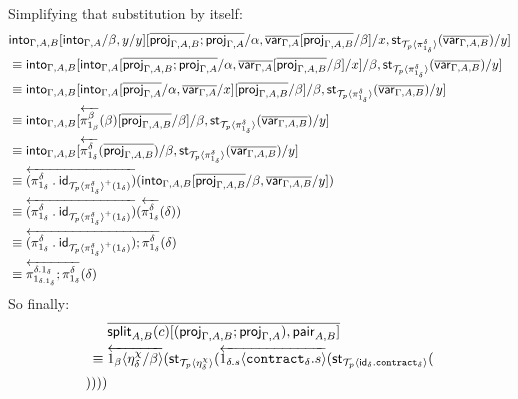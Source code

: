 \documentclass[10pt]{article}
\theoremstyle{definition}
\newcommand{\id}{\mathsf{id}}
\newcommand{\rewrite}[2]{\overleftarrow{#1}(#2)}
\newcommand\StI[2]{\ensuremath{\mathsf{st}_{#1}(#2)}}
\newcommand\TrPlus[2]{\ensuremath{{#1}^+(#2)}}
\newcommand\ApEl[2]{\mathcal{T}_{#1}\langle#2\rangle}
\newcommand\bdot[0]{\mathbin{.}}
\newcommand\ap[2]{\ensuremath{#1 \langle #2 \rangle }}
\begin{document}
\begin{enumerate}[style = multiline, labelwidth = 80pt]
Simplifying that substitution by itself:
\begin{align*}
&\into{\Gamma, A, B}[\into{\Gamma, A}/\beta, y/y][\upstairs{\proj{\Gamma, A, B};\proj{\Gamma, A}}/\alpha, \upstairs{\var{\Gamma, A}}[\upstairs{\proj{\Gamma, A, B}}/\beta]/x, \StI{\ApEl{p}{\pi^{\delta}_{1_{\delta}}}}{\upstairs{\var{\Gamma, A, B}}}/y] \\
&\equiv \into{\Gamma, A, B}[\into{\Gamma, A}[\upstairs{\proj{\Gamma, A, B};\proj{\Gamma, A}}/\alpha, \upstairs{\var{\Gamma, A}}[\upstairs{\proj{\Gamma, A, B}}/\beta]/x] /\beta, \StI{\ApEl{p}{\pi^{\delta}_{1_{\delta}}}}{\upstairs{\var{\Gamma, A, B}}}/y] \\
&\equiv \into{\Gamma, A, B}[\into{\Gamma, A}[\upstairs{\proj{\Gamma, A}}/\alpha, \upstairs{\var{\Gamma, A}}/x][\upstairs{\proj{\Gamma, A, B}}/\beta]/\beta, \StI{\ApEl{p}{\pi^{\delta}_{1_{\delta}}}}{\upstairs{\var{\Gamma, A, B}}}/y] \\
&\equiv \into{\Gamma, A, B}[\rewrite{\pi^{\beta}_{1_{\beta}}}{\beta}[\upstairs{\proj{\Gamma, A, B}}/\beta]/\beta, \StI{\ApEl{p}{\pi^{\delta}_{1_{\delta}}}}{\upstairs{\var{\Gamma, A, B}}}/y] \\
&\equiv \into{\Gamma, A, B}[\rewrite{\pi^{\delta}_{1_{\delta}}}{\upstairs{\proj{\Gamma, A, B}}}/\beta, \StI{\ApEl{p}{\pi^{\delta}_{1_{\delta}}}}{\upstairs{\var{\Gamma, A, B}}}/y]\\
&\equiv \rewrite{(\pi^{\delta}_{1_{\delta}} \bdot \id_{\TrPlus{\ApEl{p}{\pi^{\delta}_{1_{\delta}}}}{1_\delta}})}{\into{\Gamma, A, B}[\upstairs{\proj{\Gamma, A, B}}/\beta, \upstairs{\var{\Gamma, A, B}}/y]}  \\
&\equiv \rewrite{(\pi^{\delta}_{1_{\delta}} \bdot \id_{\TrPlus{\ApEl{p}{\pi^{\delta}_{1_{\delta}}}}{1_\delta}})}{\rewrite{\pi^{\delta}_{1_{\delta}}}{\delta}}  \\
&\equiv \rewrite{(\pi^{\delta}_{1_{\delta}} \bdot \id_{\TrPlus{\ApEl{p}{\pi^{\delta}_{1_{\delta}}}}{1_\delta}});\pi^{\delta}_{1_{\delta}}}{\delta}  \\
&\equiv \rewrite{\pi^{\delta.1_\delta}_{1_{\delta.1_\delta}};\pi^{\delta}_{1_{\delta}}}{\delta}
\end{align*}
So finally:
\begin{align*}
&\upstairs{\qsplit{A,B}(c)[(\proj{\Gamma, A, B};\proj{\Gamma, A}), \allowbreak\qpair{A,B}]} \\
\equiv{} &\rewrite{\ap{1_\beta}{\eta^\chi_{\delta}/\beta}}{\StI{\ApEl{p}{\eta^\chi_{\delta}}}{\rewrite{\ap{1_{\delta.s}}{\contract{\delta}.s}}{\StI{\ApEl{p}{\id_\delta \bdot \contract{\delta}}}{\\
}}}}
\end{align*}
\end{enumerate}
\end{document}
